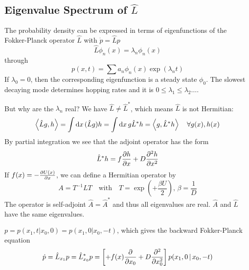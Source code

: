 \documentclass{notebook}
\begin{document}
\subsection*{Eigenvalue Spectrum of $\hat{L}$}

The probability density can be expressed in terms of eigenfunctions of the Fokker-Planck operator $\hat{L}$ with $\dot{p} = \hat{L} p$
%
\begin{equation}
\hat{L} \phi_n(x) = \lambda_n \phi_n(x)
\end{equation}
%
through
%
\begin{equation}
p(x,t) = \sum a_n \phi_n(x) \exp(\lambda_n t)
\end{equation}
%
If $\lambda_0 = 0$, then the corresponding eigenfunction is a steady state $\phi_0$. The slowest decaying mode determines hopping rates and it is $0 \leq \lambda_1 \leq \lambda_2 \dots$. 

But why are the $\lambda_n$ real? We have $\hat{L} \neq \hat{L}^*$, which means $\hat{L}$ is not Hermitian:
%
\begin{equation}
\expval{\hat{L}g,h}= \int \dd{x} (\hat{L}g)h = \int \dd{x} g \hat{L}^*h = \expval{g,\hat{L}^* h} \quad \forall g(x), h(x)
\end{equation}
%
By partial integration we see that the adjoint operator has the form
%
\begin{equation}
\hat{L}^*h = f \pdv{h}{x} + D \pdv[2]{h}{x}
\end{equation}
%
If $f(x) = - \pdv{U(x)}{x}$, we can define a Hermitian operator by
%
\begin{equation}
A = T^{-1} L T \quad \mathrm{with} \quad T = \exp(+\frac{\beta U}{2}), \, \beta = \frac{1}{D}
\end{equation}
%
The operator is self-adjoint $\hat{A} = \hat{A}^*$ and thus all eigenvalues are real. $\hat{A}$ and $\hat{L}$ have the same eigenvalues. 

\begin{theorem}
	$p = p(x_1,t|x_0,0) = p(x_1,0|x_0,-t)$, which gives the backward Fokker-Planck equation
	\begin{equation}
	\dot{p} = \hat{L}_{x_1} p = \hat{L}^*_{x_0} p = \left[ + f(x) \pdv{x_0} + D \pdv[2]{x_0} \right] p(x_1,0 \, | \, x_0,-t)
	\end{equation}
\end{theorem}
\end{document}
